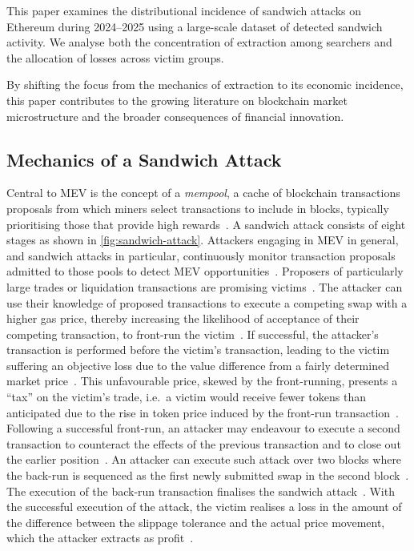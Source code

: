 \documentclass[pdflatex, sn-basic]{sn-jnl}
\theoremstyle{thmstylethree}%
\begin{document}
This paper examines the distributional incidence of sandwich attacks on Ethereum during 2024--2025 using a large-scale dataset of detected sandwich activity.
We analyse both the concentration of extraction among searchers and the allocation of losses across victim groups.

By shifting the focus from the mechanics of extraction to its economic incidence, this paper contributes to the growing literature on blockchain market microstructure and the broader consequences of financial innovation.


	\subsection{Mechanics of a Sandwich Attack}
	\label{subsec:mechanics}

	Central to \ac{MEV} is the concept of a \emph{mempool}, a cache of blockchain transactions proposals from which miners select transactions to include in blocks, typically prioritising those that provide high rewards~\citep{Saad2019}.
	A sandwich attack consists of eight stages as shown in \autoref{fig:sandwich-attack}.
	Attackers engaging in \ac{MEV} in general, and sandwich attacks in particular, continuously monitor transaction proposals admitted to those pools to detect \ac{MEV} opportunities~\citep{Prasath2024}.
	Proposers of particularly large trades or liquidation transactions are promising victims~\citep{Weintraub2022}.
	The attacker can use their knowledge of proposed transactions to execute a competing swap with a higher gas price, thereby increasing the likelihood of acceptance of their competing transaction, to front-run the victim~\citep{Stucke2022}.
	If successful, the attacker's transaction is performed before the victim's transaction, leading to the victim suffering an objective loss due to the value difference from a fairly determined market price~\citep{Choi2024}.
	This unfavourable price, skewed by the front-running, presents a \enquote{tax} on the victim's trade, i.e.\ a victim would receive fewer tokens than anticipated due to the rise in token price induced by the front-run transaction~\citep{Heimbach2022}.
	Following a successful front-run, an attacker may endeavour to execute a second transaction to counteract the effects of the previous transaction and to close out the earlier position~\citep{Zhao2025}.
	An attacker can execute such attack over two blocks where the back-run is sequenced as the first newly submitted swap in the second block~\citep{Baum2023}.
	The execution of the back-run transaction finalises the sandwich attack~\citep{Guidi2025}.
	With the successful execution of the attack, the victim realises a loss in the amount of the difference between the slippage tolerance and the actual price movement, which the attacker extracts as profit~\citep{Heimbach2022}.
\end{document}
